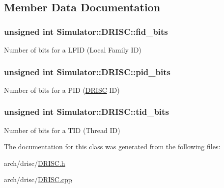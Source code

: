 \subsection{Member Data Documentation}
\hypertarget{class_simulator_1_1_d_r_i_s_c_addf17acc6521e7abac88d10798979009}{
\subsubsection[{fid\+\_\+bits}]{\setlength{\rightskip}{0pt plus 5cm}unsigned int Simulator\+::\+D\+R\+I\+S\+C\+::fid\+\_\+bits}}\label{class_simulator_1_1_d_r_i_s_c_addf17acc6521e7abac88d10798979009}


Number of bits for a L\+F\+I\+D (Local Family I\+D) 

\hypertarget{class_simulator_1_1_d_r_i_s_c_aaf88194478d3a8df5d8966fc855a1ea3}{
\subsubsection[{pid\+\_\+bits}]{\setlength{\rightskip}{0pt plus 5cm}unsigned int Simulator\+::\+D\+R\+I\+S\+C\+::pid\+\_\+bits}}\label{class_simulator_1_1_d_r_i_s_c_aaf88194478d3a8df5d8966fc855a1ea3}


Number of bits for a P\+I\+D (\hyperlink{class_simulator_1_1_d_r_i_s_c}{D\+R\+I\+S\+C} I\+D) 

\hypertarget{class_simulator_1_1_d_r_i_s_c_a729c4622ec32e140463bebaad14ccb23}{
\subsubsection[{tid\+\_\+bits}]{\setlength{\rightskip}{0pt plus 5cm}unsigned int Simulator\+::\+D\+R\+I\+S\+C\+::tid\+\_\+bits}}\label{class_simulator_1_1_d_r_i_s_c_a729c4622ec32e140463bebaad14ccb23}


Number of bits for a T\+I\+D (Thread I\+D) 



The documentation for this class was generated from the following files\+:\begin{DoxyCompactItemize}
\item 
arch/drisc/\hyperlink{_d_r_i_s_c_8h}{D\+R\+I\+S\+C.\+h}\item 
arch/drisc/\hyperlink{_d_r_i_s_c_8cpp}{D\+R\+I\+S\+C.\+cpp}\end{DoxyCompactItemize}
